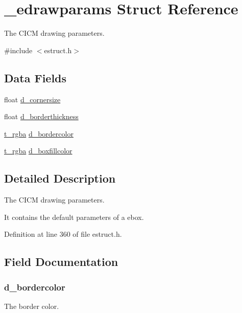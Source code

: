 \hypertarget{struct__edrawparams}{\section{\-\_\-edrawparams Struct Reference}
\label{struct__edrawparams}
}


The C\-I\-C\-M drawing parameters.  




{\ttfamily \#include $<$estruct.\-h$>$}

\subsection*{Data Fields}
\begin{DoxyCompactItemize}
\item 
float \hyperlink{struct__edrawparams_aabe78053b56e3bf3df55c7b85fa251b2}{d\-\_\-cornersize}
\item 
float \hyperlink{struct__edrawparams_a9c360cb962f79a835ed0457d1dad34b5}{d\-\_\-borderthickness}
\item 
\hyperlink{struct__rgba}{t\-\_\-rgba} \hyperlink{struct__edrawparams_af4ac3d463e5738bdbf0c2bbf15be9ae3}{d\-\_\-bordercolor}
\item 
\hyperlink{struct__rgba}{t\-\_\-rgba} \hyperlink{struct__edrawparams_aaf0259436a4f71d6659c0447e4b98e2b}{d\-\_\-boxfillcolor}
\end{DoxyCompactItemize}


\subsection{Detailed Description}
The C\-I\-C\-M drawing parameters. 

It contains the default parameters of a ebox. 

Definition at line 360 of file estruct.\-h.



\subsection{Field Documentation}
\hypertarget{struct__edrawparams_af4ac3d463e5738bdbf0c2bbf15be9ae3}{
\subsubsection[{d\-\_\-bordercolor}]{ d\-\_\-bordercolor}}\label{struct__edrawparams_af4ac3d463e5738bdbf0c2bbf15be9ae3}
The border color. 

